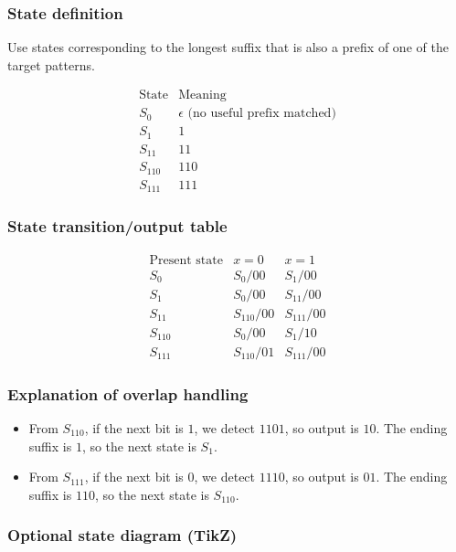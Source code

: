 \documentclass[12pt,a4paper]{article}
\begin{document}
\subsubsection*{State definition}

Use states corresponding to the longest suffix that is also a prefix of one of the target patterns.

\[
\begin{array}{c|l}
\text{State} & \text{Meaning} \\
\hline
S_0 & \epsilon \text{ (no useful prefix matched)}\\
S_1 & 1\\
S_{11} & 11\\
S_{110} & 110\\
S_{111} & 111
\end{array}
\]

\subsubsection*{State transition/output table}

\[
\boxed{
\begin{array}{c|c|c}
\text{Present state} & x=0 & x=1 \\
\hline
S_0   & S_0/00   & S_1/00 \\
S_1   & S_0/00   & S_{11}/00 \\
S_{11}& S_{110}/00 & S_{111}/00 \\
S_{110} & S_0/00 & S_1/10 \\
S_{111} & S_{110}/01 & S_{111}/00
\end{array}}
\]

\subsubsection*{Explanation of overlap handling}

\begin{itemize}[leftmargin=2em]
    \item From \(S_{110}\), if the next bit is \(1\), we detect \(1101\), so output is \(10\).  
    The ending suffix is \(1\), so the next state is \(S_1\).
    \item From \(S_{111}\), if the next bit is \(0\), we detect \(1110\), so output is \(01\).  
    The ending suffix is \(110\), so the next state is \(S_{110}\).
\end{itemize}

\subsubsection*{Optional state diagram (TikZ)}
\end{document}
